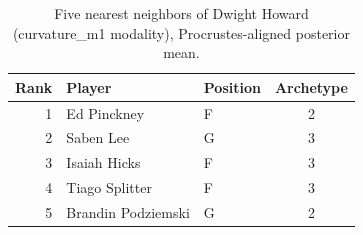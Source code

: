 \begin{table}[htbp]
  \centering\small
  \begin{tabular}{rllc}
    \toprule
    Rank & Player & Position & Archetype \\
    \midrule
    1 & Ed Pinckney & F & 2 \\
    2 & Saben Lee & G & 3 \\
    3 & Isaiah Hicks & F & 3 \\
    4 & Tiago Splitter & F & 3 \\
    5 & Brandin Podziemski & G & 2 \\
    \bottomrule
  \end{tabular}
  \caption{Five nearest neighbors of Dwight Howard (curvature_m1 modality), Procrustes-aligned posterior mean.}
  \label{tab:Dwight_Howard_neighbors_curvature_m1}
\end{table}

